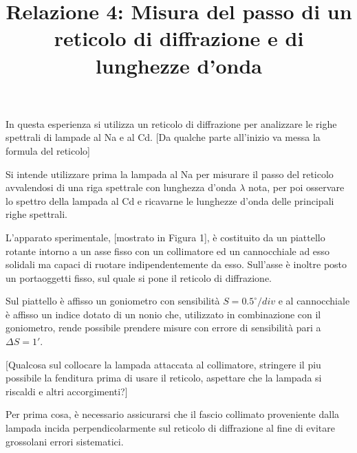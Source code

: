 \documentclass{article}
\title{Relazione 4: Misura del passo di un reticolo di diffrazione
	e di lunghezze d'onda}
\date{}
\begin{document}
	\maketitle
	
	
	In questa esperienza si utilizza un reticolo di diffrazione per analizzare le righe spettrali di lampade al Na e al Cd.  [Da qualche parte all'inizio va messa la formula del reticolo]
	
	Si intende utilizzare prima la lampada al Na per misurare il passo del reticolo avvalendosi di una riga spettrale con lunghezza d'onda $\lambda$ nota, per poi osservare lo spettro della lampada al Cd e ricavarne le lunghezze d'onda delle principali righe spettrali.
	
	L'apparato sperimentale, [mostrato in Figura 1], è costituito da un piattello rotante intorno a un asse fisso con un collimatore ed un cannocchiale ad esso solidali ma capaci di ruotare indipendentemente da esso. Sull'asse è inoltre posto un portaoggetti fisso, sul quale si pone il reticolo di diffrazione.
	
	Sul piattello è affisso un goniometro con sensibilità $S=0.5^{\circ} / div$ e al cannocchiale è affisso un indice dotato di un nonio che, utilizzato in combinazione con il goniometro, rende possibile prendere misure con errore di sensibilità pari a $\Delta S = 1'$.
	
	[Qualcosa sul collocare la lampada attaccata al collimatore, stringere il piu possibile la fenditura prima di usare il reticolo, aspettare che la lampada si riscaldi e altri accorgimenti?]

	Per prima cosa, è necessario assicurarsi che il fascio collimato proveniente dalla lampada incida perpendicolarmente sul reticolo di diffrazione al fine di evitare grossolani errori sistematici. 
	
	
\end{document}
